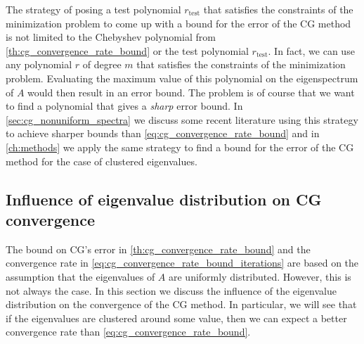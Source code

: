 The strategy of posing a test polynomial $r_{\textrm{test}}$ that satisfies the constraints of the minimization problem to come up with a bound for the error of the CG method is not limited to the Chebyshev polynomial from \cref{th:cg_convergence_rate_bound} or the test polynomial $r_{\textrm{test}}$. In fact, we can use any polynomial $r$ of degree $m$ that satisfies the constraints of the minimization problem. Evaluating the maximum value of this polynomial on the eigenspectrum of $A$ would then result in an error bound. The problem is of course that we want to find a polynomial that gives a \textit{sharp} error bound. In \cref{sec:cg_nonuniform_spectra} we discuss some recent literature using this strategy to achieve sharper bounds than \cref{eq:cg_convergence_rate_bound} and in \cref{ch:methods} we apply the same strategy to find a bound for the error of the CG method for the case of clustered eigenvalues.

\subsection{Influence of eigenvalue distribution on CG convergence}\label{sec:cg_eigenvalue_distribution}
The bound on CG's error in \cref{th:cg_convergence_rate_bound} and the convergence rate in \cref{eq:cg_convergence_rate_bound_iterations} are based on the assumption that the eigenvalues of $A$ are uniformly distributed. However, this is not always the case. In this section we discuss the influence of the eigenvalue distribution on the convergence of the CG method. In particular, we will see that if the eigenvalues are clustered around some value, then we can expect a better convergence rate than \cref{eq:cg_convergence_rate_bound}.

